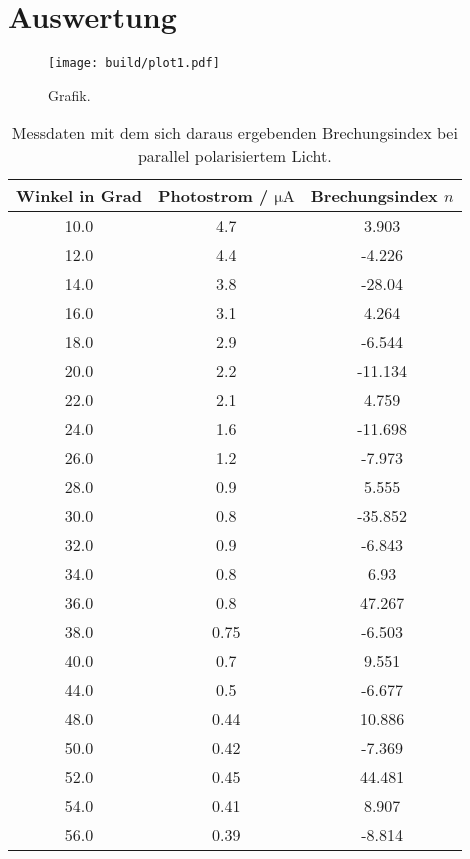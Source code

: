 \section{Auswertung}
\label{sec:Auswertung}

\begin{figure}[H]
    \centering
    \texttt{[image: build/plot1.pdf]}
    \caption{Grafik.}
    \label{fig:plot1}
  \end{figure}

\begin{table}[H]
    \centering
    \caption{Messdaten mit dem sich daraus ergebenden Brechungsindex bei parallel polarisiertem Licht.}
    \label{tab:ppolMess}
    \begin{tabular}{c c c}
        \toprule
        Winkel in Grad & Photostrom / $\si{\micro\ampere}$  & Brechungsindex $n$ \\
        \midrule
        10.0  &  4.7  &  3.903  \\
        12.0  &  4.4  &  -4.226  \\
        14.0  &  3.8  &  -28.04  \\
        16.0  &  3.1  &  4.264  \\
        18.0  &  2.9  &  -6.544  \\
        20.0  &  2.2  &  -11.134  \\
        22.0  &  2.1  &  4.759  \\
        24.0  &  1.6  &  -11.698  \\
        26.0  &  1.2  &  -7.973  \\
        28.0  &  0.9  &  5.555  \\
        30.0  &  0.8  &  -35.852  \\
        32.0  &  0.9  &  -6.843  \\
        34.0  &  0.8  &  6.93  \\
        36.0  &  0.8  &  47.267  \\
        38.0  &  0.75  &  -6.503  \\
        40.0  &  0.7  &  9.551  \\
        44.0  &  0.5  &  -6.677  \\
        48.0  &  0.44  &  10.886  \\
        50.0  &  0.42  &  -7.369  \\
        52.0  &  0.45  &  44.481  \\
        54.0  &  0.41  &  8.907  \\
        56.0  &  0.39  &  -8.814  \\

\end{tabular}
\end{table}

